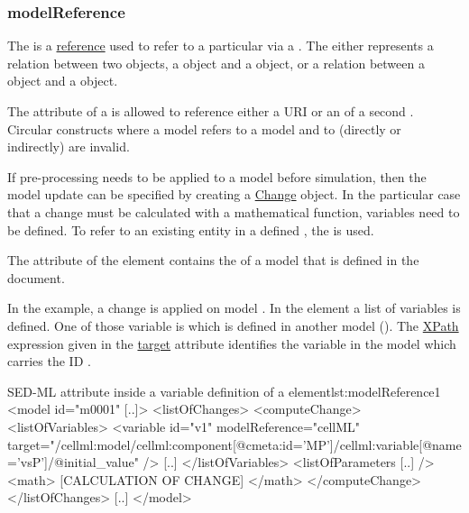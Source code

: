 \subsubsection{modelReference}
\label{sec:modelReference}
The  is a \hyperref[sec:reference]{reference} used to refer to a particular \Model via a \SIdRef. The  either represents a relation between two \Model objects, a \Variable object and a \Model object, or a relation between a \Task object and a \Model object.

The \hyperref[sec:model_source]{} attribute of a \Model is allowed to reference either a URI or an \SId of a second \Model. Circular constructs where a model  refers to a model  and  to  (directly or indirectly) are invalid.

If pre-processing needs to be applied to a model before simulation, then the model update can be specified by creating a \hyperref[class:change]{Change} object. In the particular case that a change must be calculated with a mathematical function, variables need to be defined. To refer to an existing entity in a defined \Model, the  is used. 

The  attribute of the  element contains the  of a model that is defined in the document. 

In the example, a change is  applied on model . In the  element a list of variables is defined. One of those variable is  which is defined in another model (). The \hyperref[sec:xpath]{XPath} expression given in the \hyperref[sec:target]{target} attribute identifies the variable in the model which carries the ID .
\begin{myXmlLst}{SED-ML  attribute inside a variable definition of a  element}{lst:modelReference1}
<model id="m0001" [..]>
	<listOfChanges>
		<computeChange>
			<listOfVariables>
				<variable id="v1" modelReference="cellML" target="/cellml:model/cellml:component[@cmeta:id='MP']/cellml:variable[@name='vsP']/@initial_value" />
     			[..]
			</listOfVariables>
			<listOfParameters [..] />
    			<math>
     			[CALCULATION OF CHANGE]
    			</math>
   		</computeChange>
	</listOfChanges>
	[..]
</model>
\end{myXmlLst}

